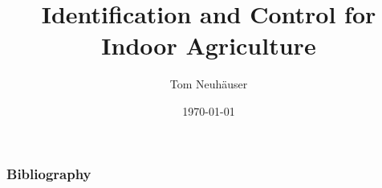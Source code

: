 \documentclass{beamer}
\title{Identification and Control for Indoor Agriculture}
\author{Tom Neuh\"auser}
\date{\today}
\begin{document}
\frame{\titlepage}







\begin{frame}
    \frametitle{Bibliography}
    
    \scriptsize
\end{frame}
\end{document}
